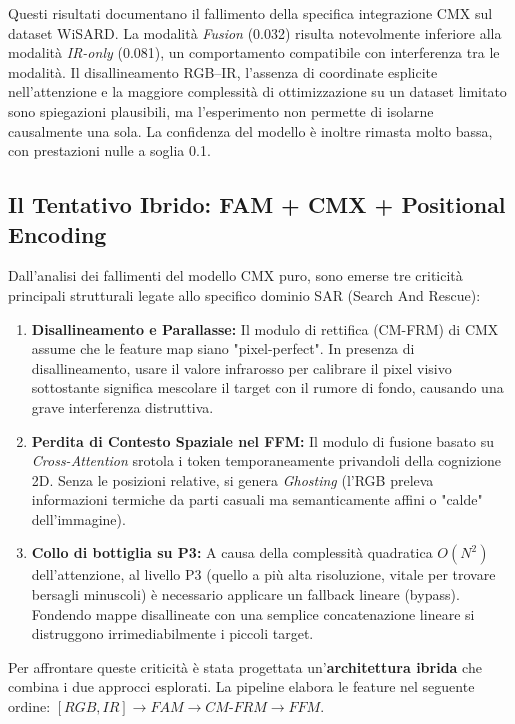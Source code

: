 \documentclass[a4paper,11pt]{article}
\begin{document}
Questi risultati documentano il fallimento della specifica integrazione CMX sul dataset WiSARD. La modalità \emph{Fusion} (0.032) risulta notevolmente inferiore alla modalità \emph{IR-only} (0.081), un comportamento compatibile con interferenza tra le modalità. Il disallineamento RGB--IR, l'assenza di coordinate esplicite nell'attenzione e la maggiore complessità di ottimizzazione su un dataset limitato sono spiegazioni plausibili, ma l'esperimento non permette di isolarne causalmente una sola. La confidenza del modello è inoltre rimasta molto bassa, con prestazioni nulle a soglia 0.1.

\subsection{Il Tentativo Ibrido: FAM + CMX + Positional Encoding}

Dall'analisi dei fallimenti del modello CMX puro, sono emerse tre criticità principali strutturali legate allo specifico dominio SAR (Search And Rescue):
\begin{enumerate}
    \item \textbf{Disallineamento e Parallasse:} Il modulo di rettifica (CM-FRM) di CMX assume che le feature map siano "pixel-perfect". In presenza di disallineamento, usare il valore infrarosso per calibrare il pixel visivo sottostante significa mescolare il target con il rumore di fondo, causando una grave interferenza distruttiva.
    \item \textbf{Perdita di Contesto Spaziale nel FFM:} Il modulo di fusione basato su \textit{Cross-Attention} srotola i token temporaneamente privandoli della cognizione 2D. Senza le posizioni relative, si genera \textit{Ghosting} (l'RGB preleva informazioni termiche da parti casuali ma semanticamente affini o "calde" dell'immagine).
    \item \textbf{Collo di bottiglia su P3:} A causa della complessità quadratica $O(N^2)$ dell'attenzione, al livello P3 (quello a più alta risoluzione, vitale per trovare bersagli minuscoli) è necessario applicare un fallback lineare (bypass). Fondendo mappe disallineate con una semplice concatenazione lineare si distruggono irrimediabilmente i piccoli target.
\end{enumerate}

Per affrontare queste criticità è stata progettata un'\textbf{architettura ibrida} che combina i due approcci esplorati. La pipeline elabora le feature nel seguente ordine: $[RGB, IR] \rightarrow FAM \rightarrow CM\text{-}FRM \rightarrow FFM$. 
\end{document}
